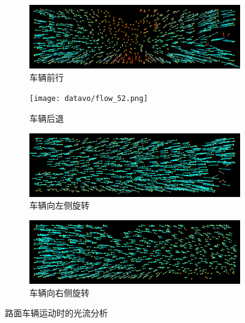 \begin{figure}[ht]
    \centering
    \begin{subfigure}[b]{0.48\textwidth}
        \includegraphics[width=\textwidth]{datavo/flow_61.png}
        \caption{车辆前行}
        \label{fig:optical_flow_f} 
    \end{subfigure}
    \vspace*{2mm}
    \begin{subfigure}[b]{0.48\textwidth}
        \texttt{[image: datavo/flow\_52.png]}
        \caption{车辆后退}
        \label{fig:optical_flow_b} 
    \end{subfigure}
    \vspace*{2mm}
    \begin{subfigure}[b]{0.48\textwidth}
        \includegraphics[width=\textwidth]{datavo/flow_196.png}
        \caption{车辆向左侧旋转}
        \label{fig:optical_flow_l} 
    \end{subfigure}
    \begin{subfigure}[b]{0.48\textwidth}
        \includegraphics[width=\textwidth]{datavo/flow_96.png}
        \caption{车辆向右侧旋转}
        \label{fig:optical_flow_r} 
    \end{subfigure}
    \caption{路面车辆运动时的光流分析}
    \label{fig:optical_flow}
\end{figure}
